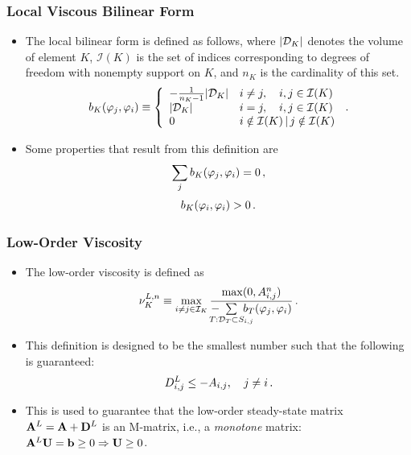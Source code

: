 \documentclass{beamer} \useoutertheme{infolines}
\begin{document}
\begin{frame}
\frametitle{Local Viscous Bilinear Form}

\begin{itemize}
   \item The local bilinear form is defined as follows, where $|\mathcal{D}_K|$ denotes
      the volume of element $K$, $\mathcal{I}(K)$ is the set of indices
      corresponding to degrees of freedom with nonempty support on $K$, and
      $n_K$ is the cardinality of this set.
   \begin{equation}
      b_K(\varphi_j, \varphi_i) \equiv \left\{\begin{array}{l l}
         -\frac{1}{n_K - 1}|\mathcal{D}_K| & i\ne j, \quad i,j\in \mathcal{I}(K)\\
         |\mathcal{D}_K|                   & i = j,  \quad i,j\in \mathcal{I}(K)\\
         0                & i\notin\mathcal{I}(K)\,|\, j\notin\mathcal{I}(K)
      \end{array}\right. \,.
   \end{equation}
   \item Some properties that result from this definition are
   \begin{equation}
      \sum\limits_j b_K(\varphi_j, \varphi_i) = 0 \,,
   \end{equation}
   \begin{equation}
      b_K(\varphi_i, \varphi_i) > 0 \,.
   \end{equation}
\end{itemize}

\end{frame}
\begin{frame}
\frametitle{Low-Order Viscosity}

\begin{itemize}
   \item The low-order viscosity is defined as
   \begin{equation}
     \lowordercellviscosity[\timeindex] \equiv \max\limits_{i\ne j\in\indicescell}
     \frac{\max(0,\ssmatrixletter\ij^\timeindex)}
     {-\mkern-20mu\sumKSij[T]\mkern-20mu\localviscbilinearform{T}{j}{i}}
     \eqp
   \end{equation}
   \item This definition is designed to be the smallest number such that the
      following is guaranteed:
   \begin{equation}
      D^L_{i,j} \leq -A_{i,j}, \quad j\ne i \,.
   \end{equation}
   \item This is used to guarantee that the low-order steady-state matrix
      $\ssmatrix^L=\ssmatrix+\diffusionmatrix^L$ is an M-matrix, i.e., a \emph{monotone} matrix:
      $\ssmatrix^L\solutionvector=\ssrhs \ge 0\Rightarrow \solutionvector\ge 0$.
\end{itemize}

\end{frame}
\end{document}
